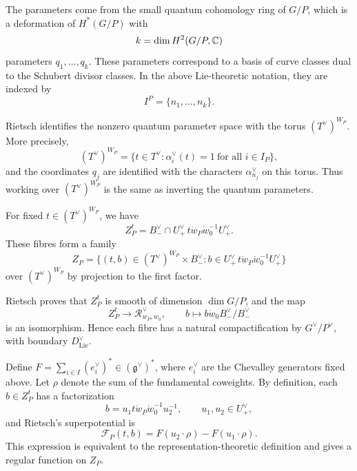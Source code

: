 The parameters come from the small quantum cohomology ring of \(G/P\), which is a deformation of \(H^*(G/P)\) with
\[
k=\dim H^2(G/P,\mathbb{C})
\]
parameters \(q_1,\ldots,q_k\). These parameters correspond to a basis of curve classes dual to the Schubert divisor classes. In the above Lie-theoretic notation, they are indexed by
\[
I^P=\{n_1,\ldots,n_k\}.
\]

Rietsch identifies the nonzero quantum parameter space with the torus \((T^\vee)^{W_P}\). More precisely,
\[
(T^\vee)^{W_P}=\{t\in T^\vee:\alpha_i^\vee(t)=1\ \text{for all }i\in I_P\},
\]
and the coordinates \(q_j\) are identified with the characters \(\alpha_{n_j}^\vee\) on this torus. Thus working over \((T^\vee)^{W_P}\) is the same as inverting the quantum parameters.


For fixed \(t\in (T^\vee)^{W_P}\), we have 
\[
Z_P^t=B_-^\vee\cap U_+^\vee\,t\dot w_P\dot w_0^{-1}U_+^\vee .
\]
These fibres form a family
\[
Z_P=
\{(t,b)\in (T^\vee)^{W_P}\times B_-^\vee:
b\in U_+^\vee\,t\dot w_P\dot w_0^{-1}U_+^\vee\}
\]
over \((T^\vee)^{W_P}\) by projection to the first factor. 

Rietsch proves that \(Z_P^t\) is smooth of dimension \(\dim G/P\), and the map
\[
Z_P^t\longrightarrow \mathcal R_{w_P,w_0}^\vee,\qquad
b\longmapsto b\dot w_0B_-^\vee/B_-^\vee
\]
is an isomorphism. Hence each fibre has a natural compactification by \(G^\vee/P^\vee\), with boundary \(D_{\mathrm{Lie}}^\vee\).

Define \(F=\sum_{i\in I}(e_i^\vee)^*\in(\mathfrak g^\vee)^*\), where \(e_i^\vee\) are the Chevalley generators fixed above. Let \(\rho\) denote the sum of the fundamental coweights. By definition, each \(b\in Z_P^t\) has a factorization
\[
b=u_1t\dot w_P\dot w_0^{-1}u_2^{-1},
\qquad u_1,u_2\in U_+^\vee,
\]
and Rietsch's superpotential \cite{Rietsch} is
\[
\mathcal F_P(t,b)=F(u_2\cdot\rho)-F(u_1\cdot\rho).
\]
This expression is equivalent to the representation-theoretic definition and gives a regular function on \(Z_P\).

